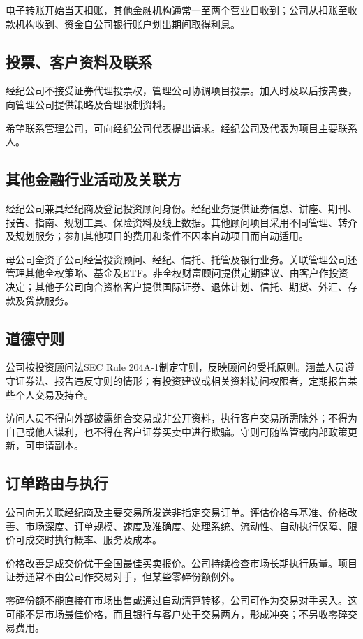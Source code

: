 \documentclass[UTF8,fontset=none,11pt,a4paper]{ctexart}
\begin{document}
电子转账开始当天扣账，其他金融机构通常一至两个营业日收到；公司从扣账至收款机构收到、资金自公司银行账户划出期间取得利息。


\subsection*{投票、客户资料及联系}
经纪公司不接受证券代理投票权，管理公司协调项目投票。加入时及以后按需要，向管理公司提供策略及合理限制资料。


希望联系管理公司，可向经纪公司代表提出请求。经纪公司及代表为项目主要联系人。


\subsection*{其他金融行业活动及关联方}
经纪公司兼具经纪商及登记投资顾问身份。经纪业务提供证券信息、讲座、期刊、报告、指南、规划工具、保险资料及线上数据。其他顾问项目采用不同管理、转介及规划服务；参加其他项目的费用和条件不因本自动项目而自动适用。


母公司全资子公司经营投资顾问、经纪、信托、托管及银行业务。关联管理公司还管理其他全权策略、基金及ETF。非全权财富顾问提供定期建议、由客户作投资决定；其他子公司向合资格客户提供国际证券、退休计划、信托、期货、外汇、存款及贷款服务。


\subsection*{道德守则}
公司按投资顾问法SEC Rule 204A-1制定守则，反映顾问的受托原则。涵盖人员遵守证券法、报告违反守则的情形；有投资建议或相关资料访问权限者，定期报告某些个人交易及持仓。


访问人员不得向外部披露组合交易或非公开资料，执行客户交易所需除外；不得为自己或他人谋利，也不得在客户证券买卖中进行欺骗。守则可随监管或内部政策更新，可申请副本。


\subsection*{订单路由与执行}
公司向无关联经纪商及主要交易所发送非指定交易订单。评估价格与基准、价格改善、市场深度、订单规模、速度及准确度、处理系统、流动性、自动执行保障、限价可成交时执行概率、服务及成本。


价格改善是成交价优于全国最佳买卖报价。公司持续检查市场长期执行质量。项目证券通常不由公司作交易对手，但某些零碎份额例外。


零碎份额不能直接在市场出售或通过自动清算转移，公司可作为交易对手买入。这可能不是市场最佳价格，而且银行与客户处于交易两方，形成冲突；不另收零碎交易费用。
\end{document}
